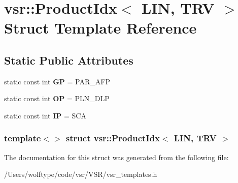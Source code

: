 \hypertarget{structvsr_1_1_product_idx_3_01_l_i_n_00_01_t_r_v_01_4}{\section{vsr\-:\-:Product\-Idx$<$ L\-I\-N, T\-R\-V $>$ Struct Template Reference}
\label{structvsr_1_1_product_idx_3_01_l_i_n_00_01_t_r_v_01_4}
}
\subsection*{Static Public Attributes}
\begin{DoxyCompactItemize}
\item 
\hypertarget{structvsr_1_1_product_idx_3_01_l_i_n_00_01_t_r_v_01_4_aa218001533649ad3a4b5fad4be9390cd}{static const int {\bfseries G\-P} = P\-A\-R\-\_\-\-A\-F\-P}\label{structvsr_1_1_product_idx_3_01_l_i_n_00_01_t_r_v_01_4_aa218001533649ad3a4b5fad4be9390cd}

\item 
\hypertarget{structvsr_1_1_product_idx_3_01_l_i_n_00_01_t_r_v_01_4_a47423339be5db5b20d5bf9c946f7dcad}{static const int {\bfseries O\-P} = P\-L\-N\-\_\-\-D\-L\-P}\label{structvsr_1_1_product_idx_3_01_l_i_n_00_01_t_r_v_01_4_a47423339be5db5b20d5bf9c946f7dcad}

\item 
\hypertarget{structvsr_1_1_product_idx_3_01_l_i_n_00_01_t_r_v_01_4_a2c86cbc7829d4e6c9899653798288bd8}{static const int {\bfseries I\-P} = S\-C\-A}\label{structvsr_1_1_product_idx_3_01_l_i_n_00_01_t_r_v_01_4_a2c86cbc7829d4e6c9899653798288bd8}

\end{DoxyCompactItemize}
\subsubsection*{template$<$$>$ struct vsr\-::\-Product\-Idx$<$ L\-I\-N, T\-R\-V $>$}



The documentation for this struct was generated from the following file\-:\begin{DoxyCompactItemize}
\item 
/\-Users/wolftype/code/vsr/\-V\-S\-R/vsr\-\_\-templates.\-h\end{DoxyCompactItemize}
